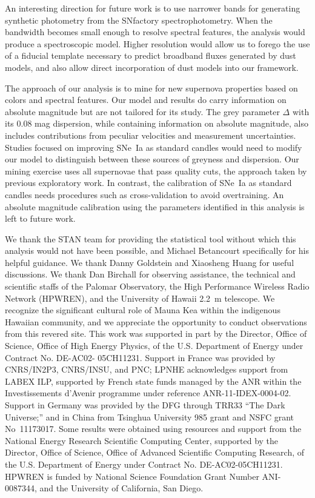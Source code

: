 \documentclass{aastex61}   	%
\begin{document}
An interesting direction for future work is to use narrower bands for generating synthetic photometry
from the SNfactory spectrophotometry.  When the bandwidth becomes small enough
to resolve spectral features, the analysis would produce a spectroscopic model.   Higher resolution would allow us to forego 
the use of a fiducial template necessary to predict broadband fluxes generated by dust models, and also allow direct incorporation
of dust models into our framework.


The approach of our analysis is to mine for new supernova properties based on colors and spectral features.
Our model and results do carry information on absolute magnitude but are not tailored for its study.
The grey parameter $\Delta$ with its
$0.08$
mag dispersion, while containing information on absolute magnitude, 
also 
includes
contributions from peculiar velocities and measurement uncertainties.  Studies
focused on improving SNe~Ia as standard candles 
would need to
modify  our model to
distinguish between these sources of greyness and dispersion.
Our
mining exercise uses all supernovae that pass quality cuts, the approach taken by previous
exploratory work.  In contrast, the calibration of SNe~Ia as standard candles needs procedures such
as cross-validation to avoid overtraining.
An absolute magnitude calibration using the parameters identified in this analysis is left to future work.


\acknowledgments
We thank the STAN team for providing the statistical tool without which this analysis would not have been possible,
and Michael Betancourt specifically for his helpful guidance.  We thank Danny Goldstein and
Xiaosheng Huang for useful discussions.
We thank Dan Birchall for observing assistance, the technical and
scientific staffs of the Palomar Observatory, the High Performance
Wireless Radio Network (HPWREN), and the University of Hawaii 2.2~m
telescope.  We recognize the significant cultural role of Mauna Kea
within the indigenous Hawaiian community, and we appreciate the
opportunity to conduct observations from this revered site.  This
work was supported in part by the Director, Office of Science,
Office of High Energy Physics, of the U.S. Department of Energy
under Contract No. DE-AC02- 05CH11231.  Support in France was
provided by CNRS/IN2P3, CNRS/INSU, and PNC; LPNHE acknowledges
support from LABEX ILP, supported by French state funds managed by
the ANR within the Investissements d'Avenir programme under reference
ANR-11-IDEX-0004-02.  Support in Germany was provided by the DFG
through TRR33 ``The Dark Universe;'' and in China from Tsinghua
University 985 grant and NSFC grant No~11173017.  Some results were
obtained using resources and support from the National Energy
Research Scientific Computing Center, supported by the Director,
Office of Science, Office of Advanced Scientific Computing Research,
of the U.S. Department of Energy under Contract No. DE-AC02-05CH11231.
HPWREN is funded by National Science Foundation Grant Number
ANI-0087344, and the University of California, San Diego.
\end{document}

